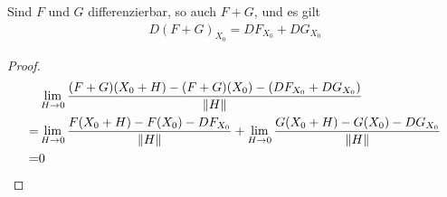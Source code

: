 \documentclass{report}
\begin{document}
\begin{theorem}
 Sind $F$ und $G$ differenzierbar, so auch $F + G$, und es gilt
 \begin{align*}
  D(F + G)_{X_0} = DF_{X_0} + DG_{X_0}
 \end{align*}
\end{theorem}
\begin{proof}
\begin{align*}
 &\lim_{H \to 0} \frac{(F+G)(X_0 + H) - (F + G)(X_0) - (DF_{X_0} + DG_{X_0})}{\norm{H}}\\
 = &\lim_{H \to 0} \frac{F(X_0 + H) - F(X_0) - DF_{X_0}}{\norm{H}} + \lim_{H \to 0} \frac{G(X_0 + H) - G(X_0) - DG_{X_0}}{\norm{H}}\\
 = &0\\
\end{align*}
\end{proof}
\end{document}
